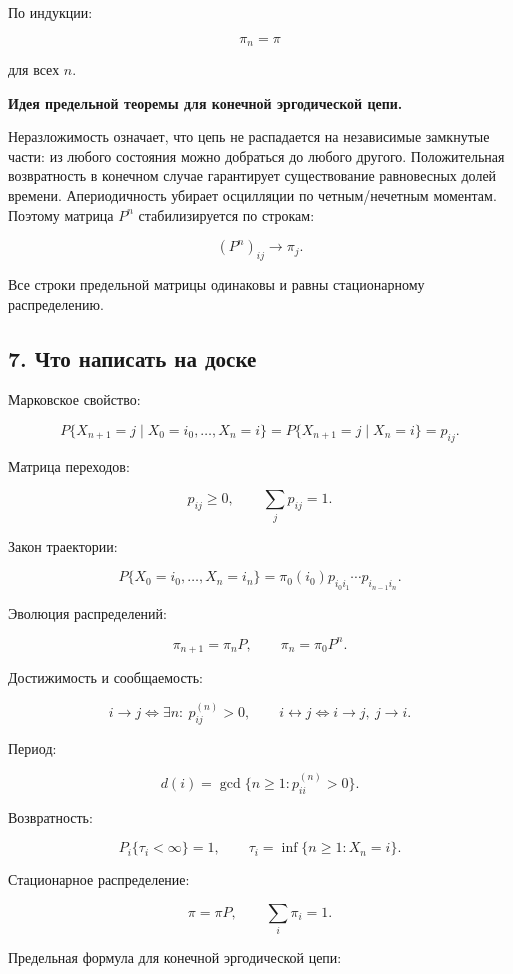 \documentclass[
  11pt,
  a4paper,
]{article}
\begin{document}
По индукции:

\[
\pi_n=\pi
\]

для всех \(n\).

\textbf{Идея предельной теоремы для конечной эргодической цепи.}

Неразложимость означает, что цепь не распадается на независимые
замкнутые части: из любого состояния можно добраться до любого другого.
Положительная возвратность в конечном случае гарантирует существование
равновесных долей времени. Апериодичность убирает осцилляции по
четным/нечетным моментам. Поэтому матрица \(P^n\) стабилизируется по
строкам:

\[
(P^n)_{ij}\to\pi_j.
\]

Все строки предельной матрицы одинаковы и равны стационарному
распределению.

\subsection{7. Что написать на
доске}\label{ux447ux442ux43e-ux43dux430ux43fux438ux441ux430ux442ux44c-ux43dux430-ux434ux43eux441ux43aux435}

Марковское свойство:

\[
P\{X_{n+1}=j\mid X_0=i_0,\ldots,X_n=i\}
=
P\{X_{n+1}=j\mid X_n=i\}
=p_{ij}.
\]

Матрица переходов:

\[
p_{ij}\ge0,
\qquad
\sum_jp_{ij}=1.
\]

Закон траектории:

\[
P\{X_0=i_0,\ldots,X_n=i_n\}
=
\pi_0(i_0)p_{i_0i_1}\cdots p_{i_{n-1}i_n}.
\]

Эволюция распределений:

\[
\pi_{n+1}=\pi_nP,
\qquad
\pi_n=\pi_0P^n.
\]

Достижимость и сообщаемость:

\[
i\to j
\Longleftrightarrow
\exists n:\ p_{ij}^{(n)}>0,
\qquad
i\leftrightarrow j
\Longleftrightarrow
i\to j,\ j\to i.
\]

Период:

\[
d(i)=\gcd\{n\ge1:p_{ii}^{(n)}>0\}.
\]

Возвратность:

\[
P_i\{\tau_i<\infty\}=1,
\qquad
\tau_i=\inf\{n\ge1:X_n=i\}.
\]

Стационарное распределение:

\[
\pi=\pi P,
\qquad
\sum_i\pi_i=1.
\]

Предельная формула для конечной эргодической цепи:
\end{document}

